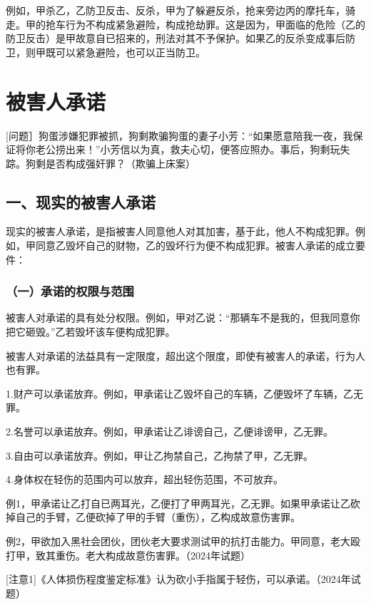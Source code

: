 例如，甲杀乙，乙防卫反击、反杀，甲为了躲避反杀，抢来旁边丙的摩托车，骑走。甲的抢车行为不构成紧急避险，构成抢劫罪。这是因为，甲面临的危险（乙的防卫反击）是甲故意自已招来的，刑法对其不予保护。如果乙的反杀变成事后防卫，则甲既可以紧急避险，也可以正当防卫。

\section{被害人承诺}

[问题］狗蛋涉嫌犯罪被抓，狗剩欺骗狗蛋的妻子小芳：“如果愿意陪我一夜，我保证将你老公捞出来！”小芳信以为真，救夫心切，便答应照办。事后，狗剩玩失踪。狗剩是否构成强奸罪？（欺骗上床案）

\subsection*{一、现实的被害人承诺}

现实的被害人承诺，是指被害人同意他人对其加害，基于此，他人不构成犯罪。例如，甲同意乙毁坏自己的财物，乙的毁坏行为便不构成犯罪。被害人承诺的成立要件：

\subsubsection*{（一）承诺的权限与范围}

被害人对承诺的具有处分权限。例如，甲对乙说：“那辆车不是我的，但我同意你把它砸毁。”乙若毁坏该车便构成犯罪。

被害人对承诺的法益具有一定限度，超出这个限度，即使有被害人的承诺，行为人也有罪。

1.财产可以承诺放弃。例如，甲承诺让乙毁坏自己的车辆，乙便毁坏了车辆，乙无罪。

2.名誉可以承诺放弃。例如，甲承诺让乙诽谤自己，乙便诽谤甲，乙无罪。

3.自由可以承诺放弃。例如，甲让乙拘禁自己，乙拘禁了甲，乙无罪。

4.身体权在轻伤的范围内可以放弃，超出轻伤范围，不可放弃。

例1，甲承诺让乙打自已两耳光，乙便打了甲两耳光，乙无罪。如果甲承诺让乙砍掉自己的手臂，乙便砍掉了甲的手臂（重伤），乙构成故意伤害罪。

例2，甲欲加入黑社会团伙，团伙老大要求测试甲的抗打击能力。甲同意，老大殴打甲，致其重伤。老大构成故意伤害罪。（2024年试题）

[注意1]《人体损伤程度鉴定标准》认为砍小手指属于轻伤，可以承诺。（2024年试题）

